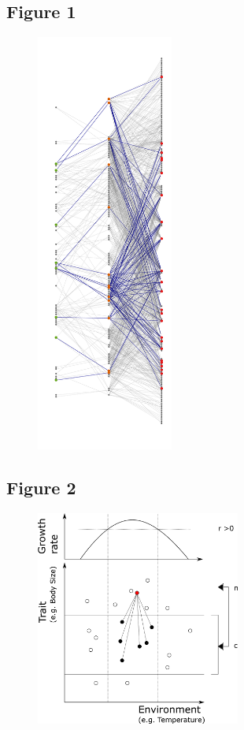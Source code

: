 \documentclass[12pt]{article}
\begin{document}
\newpage

\subsection*{Figure 1}

\begin{figure}[ht!]
\centering\includegraphics[width=0.4\textwidth]{figures/mw_sampling}
\end{figure}

\newpage

\subsection*{Figure 2}

\begin{figure}[ht!]
\centering\includegraphics[width=0.6\textwidth]{figures/integrated_niche}
\end{figure}
\end{document}
